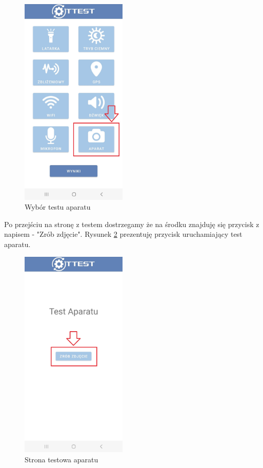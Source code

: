\begin{figure}[!hbt]
	\begin{center}
		\includegraphics[angle=360, width=0.45\textwidth]{rys/punkt6/menu7}
		\caption{Wybór testu aparatu}
		\label{rys:menu7}
	\end{center}
\end{figure}

\newpage


Po przejściu na stronę z testem dostrzegamy że na środku znajduję się przycisk z napisem - "Zrób zdjęcie". Rysunek \ref{rys:aparat} prezentuję przycisk uruchamiający test aparatu.

\begin{figure}[!hbt]
	\begin{center}
		\includegraphics[angle=360, width=0.45\textwidth]{rys/punkt6/aparat}
		\caption{Strona testowa aparatu}
		\label{rys:aparat}
	\end{center}
\end{figure}

